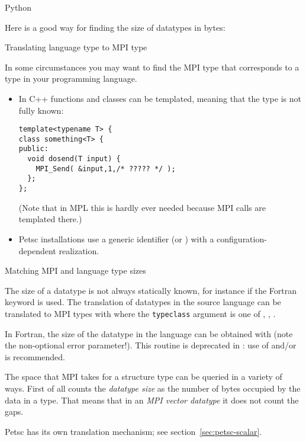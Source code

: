  {Python}

Here is a good way for finding the size of  datatypes
in bytes:

 {Translating language type to MPI type}

In some circumstances you may want to find the MPI type
that corresponds to a type in your programming language.
\begin{itemize}
\item In C++ functions and classes can be templated,
  meaning that the type is not fully known:
\begin{lstlisting}
template<typename T> {
class something<T> {
public:
  void dosend(T input) {
    MPI_Send( &input,1,/* ????? */ );
  };
};
\end{lstlisting}
(Note that in \ac{MPL} this is hardly ever needed
because MPI calls are templated there.)
\item Petsc installations use a generic identifier 
  (or )
  with a configuration-dependent realization.
\end{itemize}

 {Matching MPI and language type sizes}
\label{sec:mpi-type-match}

The size of a datatype is not always statically known, for instance if
the Fortran  keyword is used. The translation of
datatypes in the source language can be translated to MPI types with
%
%
where the \lstinline{typeclass} argument is one of
,
,
.


In Fortran, the size of the datatype in the language can be obtained with
 (note the non-optional error parameter!).
This routine is deprecated in : use of
 and/or  is recommended.


The space that MPI takes for a structure type can be queried in a
variety of ways. First of all  counts the
\emph{datatype size} as the 
number of bytes occupied by the data in a type. That means that in an
\emph{MPI vector datatype} it does not
count the gaps.
%

\begin{comment}
In C, the \indexmpidef{MPI_Datatype} type is defined through the pre-processor,
allowing you to write:
\cverbatimsnippet{datatypevar}
\end{comment}

Petsc has its own translation mechanism; see section~\ref{sec:petsc-scalar}.


